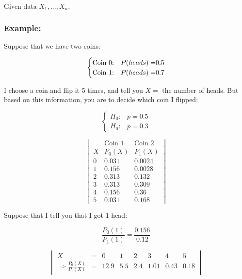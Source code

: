 \documentclass{article}
\begin{document}
Given data $X_1,...,X_n$.

\subsubsection*{Example:}

Suppose that we have two coins:

\begin{equation*}
\begin{cases}
\text{Coin 0:} & P(heads) = $0.5$\\
\text{Coin 1:} & P(heads) = $0.7$
\end{cases}
\end{equation*}

I choose a coin and flip it 5 times, and tell you $X = $ the number of heads. But based on this information, you are to decide which coin I flipped:

\begin{equation*}
    \begin{cases}
        H_0: & p = 0.5\\
        H_a: & p = 0.3
    \end{cases}
\end{equation*}


\begin{equation*}
    \begin{vmatrix}
         &\text{Coin 1} & \text{Coin 2}\\
        X & P_0(X) & P_1(X) \\
        0 & 0.031 & 0.0024 \\
        1 & 0.156 & 0.0028 \\
        2 & 0.313 & 0.132 \\
        3 & 0.313 & 0.309 \\
        4 & 0.156 & 0.36 \\
        5 & 0.031 & 0.168
    \end{vmatrix}
\end{equation*}

Suppose that I tell you that I got $1$ head:

\begin{equation*}
    \frac{P_0(1)}{P_1(1)} = \frac{0.156}{0.12}
\end{equation*}


\begin{equation*}
    \begin{vmatrix}
        X & = & 0 & 1 & 2 & 3 & 4 & 5\\
        \Rightarrow \frac{P_0(X)}{P_1(X)} & =  & 12.9 & 5.5 & 2.4 & 1.01 & 0.43 & 0.18
    \end{vmatrix}
\end{equation*}
\end{document}

